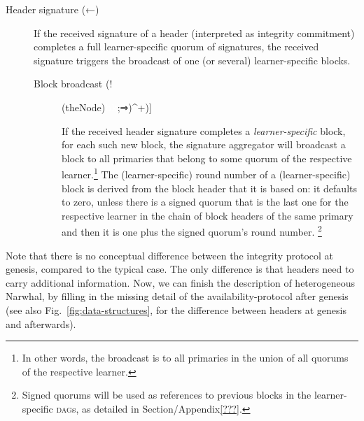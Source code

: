 \documentclass[%
dvipsnames]{article}
\theoremstyle{definition}
\newcommand{\xnote}[1]{
  \marginnote{\footnotesize #1}%
}
\newcommand{\Dag}[1][]{\textsc{dag}#1\xspace}
\newcommand{\fig}[1][]{Fig.~}
\newcommand{\bk}[1][green!60!black]{\tikz[baseline={([yshift=0pt]theNode.base)}]{\node[regular polygon, regular polygon sides=6
,double,inner sep=.5pt,outer sep=0pt,fill=#1] (theNode){\textcolor{white}{\footnotesize \bf bk}};}}
\newcommand{\hd}[1][ ]{%
  \ifthenelse{\equal{#1}{}}%
  {\tikz[baseline={([yshift=0pt]theNode.base)}]{
      \node[rectangle,inner sep=1.5pt,outer sep=0pt,double] (theNode){\textcolor{black}{\footnotesize \bf \ul{HD}}};
    }}%
  {\tikz[baseline={([yshift=0pt]theNode.base)}]{
      \node[rectangle,double,inner sep=1.5pt,outer sep=0pt,double,draw] (theNode){\textcolor{black}{\footnotesize \bf HD}};
    }}%
}
\begin{document}
\begin{description}
\item[Header signature (←)]
  \xnote{%
    primary\\
    ←primary
  }
  If the received signature of a header
  (interpreted as {integrity commitment})
  completes a full 
learner-specific quorum of signatures, 
  the received signature triggers the broadcast of one (or several) learner-specific blocks.

  \begin{description}
  \item[Block broadcast (!\((\bk⇒)^+\))]
    \xnote{%
      primary \\
      ⇒ primary
    }
    If the received header signature 
    completes a \emph{learner-specific} block, 
    for each such new block, %
    the signature aggregator will broadcast a block
    to all primaries that belong to some quorum of the respective
    learner.\footnote{%
      In other words, 
      the broadcast is to  all primaries in the union of all quorums of
      the respective learner. 
    }
    The (learner-specific) round number of a (learner-specific) block 
    is derived from the block header that it is based on: 
    it defaults to zero, 
    unless there is a signed quorum that is the last one for the respective learner
    in the chain of block headers of the same primary
    and
    then it is one plus the signed quorum's round number.\xspace%
    \footnote{%
      Signed quorums will be used as references to previous blocks in %
      the learner-specific \Dag[s],
      as detailed in Section/Appendix\ref{???}. %
    }
  \end{description}

\end{description}
Note that there is no conceptual difference between
the integrity protocol at genesis,
compared to the typical case.
The only difference is that headers need to carry 
additional information.
Now, 
we can finish the description of heterogeneous Narwhal,
by filling in the missing detail of the availability-protocol after genesis
(see also \fig\ref{fig:data-structures},
for the difference between headers at genesis and afterwards).
\end{document}
